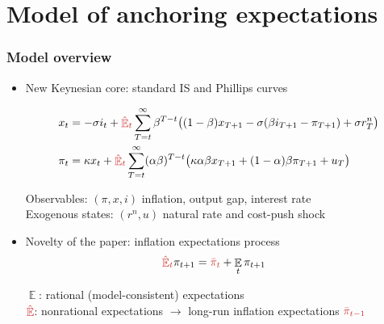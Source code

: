 \documentclass[10pt]{beamer}
\DeclareMathOperator{\E}{\mathbb{E}}
\begin{document}
\section{Model of anchoring expectations}




\begin{frame}
	\frametitle{Model overview}
	\label{model_overview}
\begin{itemize}
\item New Keynesian core: standard IS and Phillips curves	\hfill \hyperlink{HH}{}

 \begin{align}
x_t &=  -\sigma i_t +\textcolor{brownreddark}{\hat{\E}_t} \sum_{T=t}^{\infty} \beta^{T-t }\big( (1-\beta)x_{T+1} - \sigma(\beta i_{T+1} - \pi_{T+1}) +\sigma r_T^n \big)  \label{NKIS}  \\
\pi_t &= \kappa x_t +\textcolor{brownreddark}{\hat{\E}_t} \sum_{T=t}^{\infty} (\alpha\beta)^{T-t }\big( \kappa \alpha \beta x_{T+1} + (1-\alpha)\beta \pi_{T+1} + u_T\big) \label{NKPC} 
\end{align}

Observables: $(\pi, x, i)$ inflation, output gap, interest rate \\
Exogenous states: $(r^n, u)$ natural rate and cost-push shock
\
\pause
\item \textcolor{brownreddark}{Novelty of the paper}: inflation expectations process 
\begin{align}
\textcolor{brownreddark}{\hat{\E}_{t}}\pi_{t+1} & = \textcolor{brownreddark}{\bar{\pi}_{t}} + \E_t\pi_{t+1}
\end{align}

$\E$: rational (model-consistent) expectations \\
$\textcolor{brownreddark}{\hat{\E}}$: nonrational expectations $\rightarrow$ long-run inflation expectations $ \textcolor{brownreddark}{\bar{\pi}_{t-1}} $

\end{itemize}



\end{frame}
\end{document}
